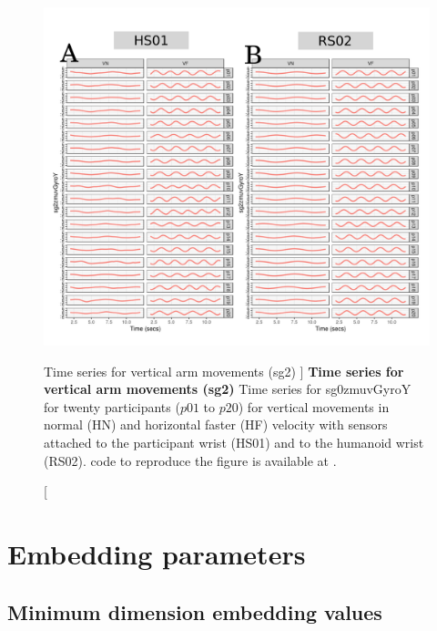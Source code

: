 \begin{figure}
\centering
\includegraphics[width=1.0\textwidth]{ts_V_sg2}
    	\caption
	[Time series for vertical arm movements (sg2) ]{
	{\bf Time series for vertical arm movements (sg2)}
		Time series for sg0zmuvGyroY for twenty participants 
		($p01$ to  $p20$) 
		for vertical movements in normal (HN) and horizontal faster (HF) 
		velocity with sensors attached to the participant wrist (HS01)
		and to the humanoid wrist (RS02).
	\R code to reproduce the figure is available at 
	.
        }
    \label{fig:aV-sg2}
\end{figure}










\newpage
\section{Embedding parameters} \label{appendix:e:ep}
\subsection{Minimum dimension embedding values}

